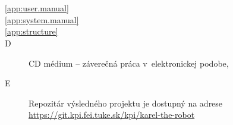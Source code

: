 
\chapter*{\appendixlistname}

\begin{description}

   \item[\autoref{app:user.manual}] 
   \item[\autoref{app:system.manual}] 
   \item[\autoref{app:structure}] 
   \item[\appendixname{} D] CD médium -- záverečná práca v~elektronickej podobe,
   \item[\appendixname{} E] Repozitár výsledného projektu je dostupný na adrese\\ \url{https://git.kpi.fei.tuke.sk/kpi/karel-the-robot}
\end{description}
